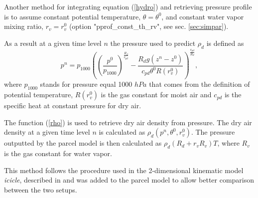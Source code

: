 \documentclass[11pt]{article}
\begin{document}
Another method for integrating equation (\ref{hydro}) and retrieving pressure profile is to
assume constant potential temperature, $\theta = \theta^0$, and constant water vapor mixing ratio, $r_v = r_v^0$ (option "pprof\_const\_th\_rv", see sec. \ref{sec:simpar}).

  As a result at a given time level $n$ the pressure used to predict $\rho_d$ is defined as
  \begin{equation*}
    p^n = p_{1000} \left( (\frac{p^0}{p_{1000}})^{\frac{R_d}{c_{pd}}} - \frac{R_d g (z^n - z^0)}{c_{pd} \theta^{0} R(r_v^0)} \right) ^ {\frac{c_{pd}}{R_d}} ,
  \end{equation*}
  \noindent
  where $p_{1000}$ stands for pressure equal 1000 $hPa$ that comes from the definition of potential temperature,
        $R(r_v^0)$ is the gas constant for moist air and
        $c_{pd}$ is the specific heat at constant pressure for dry air.

The function (\ref{rho}) is used to retrieve dry air density from pressure. The dry air density at a given time level $n$ is calculated as $\rho_d(p^n, \theta^0, r_v^0)$.
The pressure outputted by the parcel model is then calculated as $ \rho_d  (R_d + r_v R_v)  T$,
  where $R_v$ is the gas constant for water vapor.

This method follows the procedure used in the 2-dimensional kinematic model \emph{icicle}, 
  described in \citep{Arabas_et_al_2015} and was added to the parcel model to allow better comparison 
  between the two setups.


\end{document}
